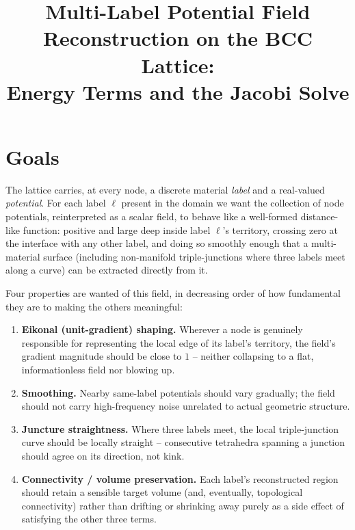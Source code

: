 \documentclass[11pt]{article}
\title{Multi-Label Potential Field Reconstruction on the BCC Lattice:\\
Energy Terms and the Jacobi Solve}
\author{}
\date{}
\begin{document}
\maketitle

\section{Goals}

The lattice carries, at every node, a discrete material \emph{label} and a
real-valued \emph{potential}. For each label $\ell$ present in the domain we
want the collection of node potentials, reinterpreted as a scalar field, to
behave like a well-formed distance-like function: positive and large deep
inside label $\ell$'s territory, crossing zero at the interface with any
other label, and doing so smoothly enough that a multi-material surface
(including non-manifold triple-junctions where three labels meet along a
curve) can be extracted directly from it.

Four properties are wanted of this field, in decreasing order of how
fundamental they are to making the others meaningful:

\begin{enumerate}
  \item \textbf{Eikonal (unit-gradient) shaping.} Wherever a node is
  genuinely responsible for representing the local edge of its label's
  territory, the field's gradient magnitude should be close to $1$ --
  neither collapsing to a flat, informationless field nor blowing up.
  \item \textbf{Smoothing.} Nearby same-label potentials should vary
  gradually; the field should not carry high-frequency noise unrelated to
  actual geometric structure.
  \item \textbf{Juncture straightness.} Where three labels meet, the local
  triple-junction curve should be locally straight -- consecutive
  tetrahedra spanning a junction should agree on its direction, not kink.
  \item \textbf{Connectivity / volume preservation.} Each label's
  reconstructed region should retain a sensible target volume (and,
  eventually, topological connectivity) rather than drifting or shrinking
  away purely as a side effect of satisfying the other three terms.
\end{enumerate}
\end{document}
